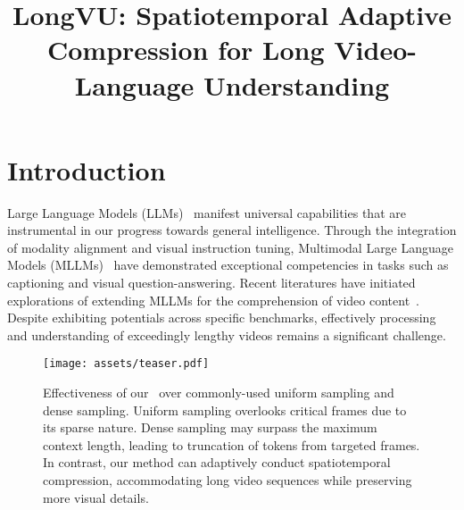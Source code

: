 \title{LongVU: Spatiotemporal Adaptive Compression for Long Video-Language Understanding}



\maketitle

\section{Introduction}

Large Language Models (LLMs)~\citep{brown2020language,ouyang2022training,chatgpt,achiam2023gpt,vicuna2023,touvron2023llama2,jiang2024mixtral} manifest universal capabilities that are instrumental in our progress towards general intelligence. Through the integration of modality alignment and visual instruction tuning, Multimodal Large Language Models (MLLMs)~\citep{alayrac2022flamingo,li2023blip2bl,zhu2023minigpt,liu2024visual,ye2023mplugowl,bai2023qwen,chen2023internvl,dong2024internlm} have demonstrated exceptional competencies in tasks such as captioning and visual question-answering. Recent literatures have initiated explorations of  extending MLLMs for the comprehension of video content~\citep{li2023videochat,zhang2023video,maaz2023video,lin2023video,wang2024internvideo2,liu2024world}. Despite exhibiting potentials across specific benchmarks, effectively processing and understanding of exceedingly lengthy videos remains a significant challenge.

\begin{figure}[t]
    \centering
    \texttt{[image: assets/teaser.pdf]}
    \caption{Effectiveness of our \modelname~over commonly-used uniform sampling and dense sampling. Uniform sampling overlooks critical frames due to its sparse nature. Dense sampling may surpass the maximum context length, leading to truncation of tokens from targeted frames. In contrast, our method can adaptively conduct spatiotemporal compression, accommodating long video sequences while preserving more visual details.}
    \label{fig:teaser}
\end{figure}

